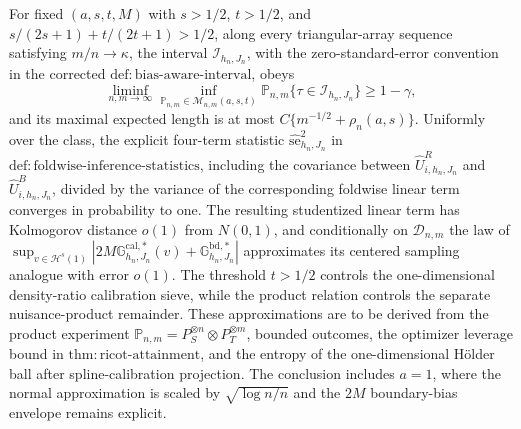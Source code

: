 For fixed \((a,s,t,M)\) with \(s>1/2\), \(t>1/2\), and \(s/(2s+1)+t/(2t+1)>1/2\), along every triangular-array sequence satisfying \(m/n\to\kappa\), the interval \(\mathcal I_{h_n,J_n}\), with the zero-standard-error convention in the corrected \(\mathrm{def:bias\text{-}aware\text{-}interval}\), obeys \[\liminf_{n,m\to\infty}\inf_{\mathbb P_{n,m}\in\mathcal M_{n,m}(a,s,t)}\mathbb P_{n,m}\{\tau\in\mathcal I_{h_n,J_n}\}\ge1-\gamma,\] and its maximal expected length is at most \(C\{m^{-1/2}+\rho_n(a,s)\}\). Uniformly over the class, the explicit four-term statistic \(\widehat{\mathrm{se}}_{h_n,J_n}^2\) in \(\mathrm{def:foldwise\text{-}inference\text{-}statistics}\), including the covariance between \(\widehat U^R_{i,h_n,J_n}\) and \(\widehat U^B_{i,h_n,J_n}\), divided by the variance of the corresponding foldwise linear term converges in probability to one. The resulting studentized linear term has Kolmogorov distance \(o(1)\) from \(N(0,1)\), and conditionally on \(\mathcal D_{n,m}\) the law of \(\sup_{v\in\mathcal H^s(1)}|2M\mathbb G^{\mathrm{cal},*}_{h_n,J_n}(v)+\mathbb G^{\mathrm{bd},*}_{h_n,J_n}|\) approximates its centered sampling analogue with error \(o(1)\). The threshold \(t>1/2\) controls the one-dimensional density-ratio calibration sieve, while the product relation controls the separate nuisance-product remainder. These approximations are to be derived from the product experiment \(\mathbb P_{n,m}=P_S^{\otimes n}\otimes P_T^{\otimes m}\), bounded outcomes, the optimizer leverage bound in \(\mathrm{thm:ricot\text{-}attainment}\), and the entropy of the one-dimensional Hölder ball after spline-calibration projection. The conclusion includes \(a=1\), where the normal approximation is scaled by \(\sqrt{\log n/n}\) and the \(2M\) boundary-bias envelope remains explicit.